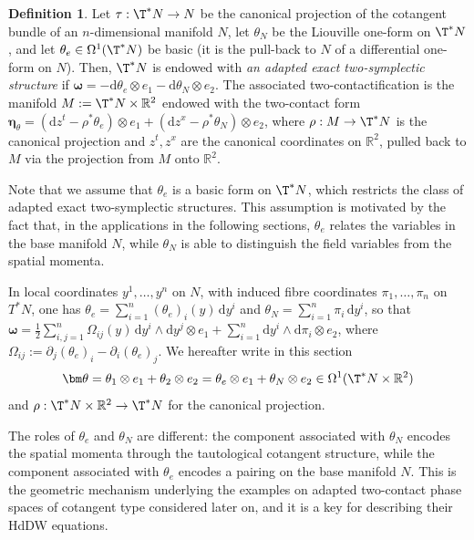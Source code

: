 \documentclass[11pt,a4paper]{article}
\newcommand{\dd}{\mathrm{d}}
\theoremstyle{plain} \newtheorem{theorem}{Theorem}[section] \newtheorem{proposition}[theorem]{Proposition} \newtheorem{corollary}[theorem]{Corollary} \newtheorem{lemma}[theorem]{Lemma} \theoremstyle{definition} \newtheorem{definition}[theorem]{Definition} \theoremstyle{remark} \newtheorem{remark}[theorem]{Remark} \newtheorem{example}[theorem]{Example} %
\begin{document}
\begin{definition}\label{def:adapted_exact_two_symplectic}
Let \(\tau:\T^*N\to N\) be the canonical projection of the cotangent bundle of an \(n\)-dimensional manifold $N$, let \(\theta_N\) be the Liouville one-form on \(\T^*N\), and let \(\theta_e\in\Omega^1(\T^*N)\) be basic (it is the pull-back to $N$ of a differential one-form on $N$). Then, \(\T^*N\) is endowed with {\it an adapted exact two-symplectic structure} if \(\bm\omega=-\dd\theta_e\otimes e_1-\dd\theta_N\otimes e_2\). The associated two-contactification is the manifold \(M:=\T^*N\times\mathbb R^2\) endowed with the two-contact form \(\bm\eta_\theta=(\dd z^t-\rho^*\theta_e)\otimes e_1+(\dd z^x-\rho^*\theta_N)\otimes e_2\), where \(\rho:M\to \T^*N\) is the canonical projection and \(z^t,z^x\) are the canonical coordinates on \(\mathbb R^2\), pulled back to \(M\) via the projection from $M$ onto \(\mathbb R^2\).
\end{definition}

Note that we assume that $\theta_e$ is a basic form on $\T^*N$, which restricts the class of adapted exact two-symplectic structures. This assumption is motivated by the fact that, in the applications in the following sections, $\theta_e$ relates the variables in  the base manifold $N$, while $\theta_N$ is able to distinguish the field variables from the spatial momenta.

In local coordinates \(y^1,\dots,y^n\) on \(N\), with induced fibre coordinates \(\pi_1,\dots,\pi_n\) on \(T^*N\), one has \(\theta_e=\sum_{i=1}^n (\theta_e)_i(y) \,\dd y^i\) and \(\theta_N=\sum_{i=1}^n \pi_i\,\dd y^i\), so that \(\bm\omega=\frac12\sum_{i,j=1}^n \Omega_{ij}(y)\,\dd y^i\wedge\dd y^j\otimes e_1+\sum_{i=1}^n \dd y^i\wedge \dd\pi_i\otimes e_2\), where \(\Omega_{ij}:=\partial_j(\theta_e)_i-\partial_i(\theta_e)_j\). We hereafter write in this section
$$
\bm\theta=\theta_1\otimes e_1+\theta_2\otimes e_2=\theta_e\otimes e_1+\theta_N\otimes e_2\in \Omega^1(\T^*N\times \mathbb{R}^2)
$$
and $\rho:\T^*N\times \mathbb{R}^2\rightarrow \T^*N$ for the canonical projection.

The roles of $\theta_e$ and $\theta_N$ are different: the component associated with \(\theta_N\) encodes the spatial momenta through the tautological cotangent structure, while the component associated with \(\theta_e\) encodes a pairing on the base manifold \(N\). This is the geometric mechanism underlying the examples on adapted two-contact phase spaces of cotangent type considered later on, and it is a key for describing their HdDW equations.
\end{document}
